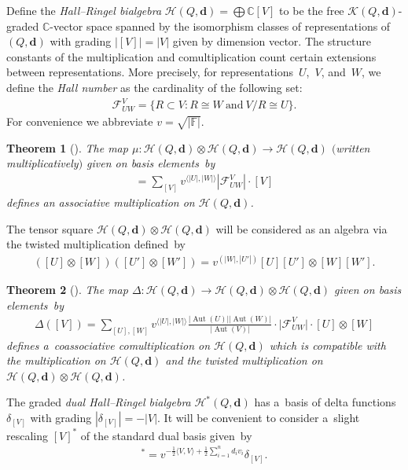 \documentclass[pdftex]{sigma}
\numberwithin{equation}{section}
\newtheorem{Theorem}{Theorem}[section]
\begin{document}
Def\/ine the \emph{Hall--Ringel bialgebra} $\mathcal{H}(Q,\mathbf{d})=\bigoplus\mathbb{C}[V]$ to be the free
$\mathcal{K}(Q,\mathbf{d})$-graded $\mathbb{C}$-vector space spanned by the isomorphism classes of representations of
$(Q,\mathbf{d})$ with grading $|[V]|=|V|$ given by dimension vector.
The structure constants of the multiplication and comultiplication count certain extensions between representations.
More precisely, for representations~$U$,~$V$, and~$W$, we def\/ine the \emph{Hall number} as the cardinality of the
following set:
\begin{gather*}
\mathcal{F}_{UW}^V=\{R\subset V: R\cong W \ \text{and} \  V/R\cong U\}.
\end{gather*}
For convenience we abbreviate $v=\sqrt{|\mathbb{F}|}$.
\begin{Theorem}[\cite{ringel2}]
The map $\mu: \mathcal{H}(Q,\mathbf{d})\otimes\mathcal{H}(Q,\mathbf{d})\to\mathcal{H}(Q,\mathbf{d})$ $($written
multiplicatively$)$ given on basis elements~by
\begin{gather*}
[U][W]=\sum\limits_{[V]}v^{\langle |U|,|W|\rangle} |\mathcal{F}_{UW}^V|\cdot[V]
\end{gather*}
defines an associative multiplication on $\mathcal{H}(Q,\mathbf{d})$.
\end{Theorem}
The tensor square $\mathcal{H}(Q,\mathbf{d})\otimes\mathcal{H}(Q,\mathbf{d})$ will be considered as an algebra via the
twisted multiplication def\/ined~by
\begin{gather*}
([U]\otimes[W])([U']\otimes[W'])=v^{(|W|,|U'|)}[U][U']\otimes[W][W'].
\end{gather*}

\begin{Theorem}[\cite{green}]\label{th:hall_comult}
The map $\Delta: \mathcal{H}(Q,\mathbf{d})\to\mathcal{H}(Q,\mathbf{d})\otimes\mathcal{H}(Q,\mathbf{d})$ given on basis
elements~by
\begin{gather*}
\Delta([V])=\sum\limits_{[U],[W]}v^{\langle |U|,|W|\rangle}
\frac{|\operatorname{Aut}(U)||\operatorname{Aut}(W)|}{|\operatorname{Aut}(V)|}\cdot\big|\mathcal{F}_{UW}^V\big|\cdot[U]\otimes[W]
\end{gather*}
defines a~coassociative comultiplication on $\mathcal{H}(Q,\mathbf{d})$ which is compatible with the multiplication on
$\mathcal{H}(Q,\mathbf{d})$ and the twisted multiplication on
$\mathcal{H}(Q,\mathbf{d})\otimes\mathcal{H}(Q,\mathbf{d})$.
\end{Theorem}

The graded \emph{dual Hall--Ringel bialgebra} $\mathcal{H}^*(Q,\mathbf{d})$ has a~basis of delta functions
$\delta_{[V]}$ with grading $|\delta_{[V]}|=-|V|$.
It will be convenient to consider a~slight rescaling $[V]^*$ of the standard dual basis given~by
\begin{gather*}
[V]^*=v^{-\frac{1}{2}\langle V,V\rangle+\frac{1}{2}\sum\limits_{i=1}^nd_iv_i}\delta_{[V]}.
\end{gather*}
\end{document}
